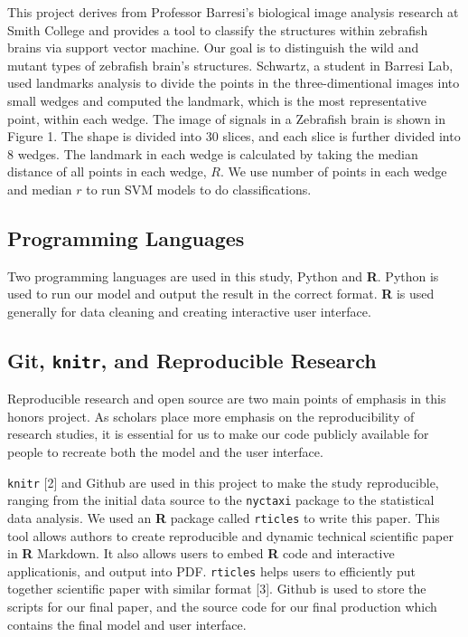 \documentclass[10pt,letterpaper]{article}
\begin{document}
This project derives from Professor Barresi's biological image analysis
research at Smith College and provides a tool to classify the structures
within zebrafish brains via support vector machine. Our goal is to
distinguish the wild and mutant types of zebrafish brain's structures.
Schwartz, a student in Barresi Lab, used landmarks analysis to divide
the points in the three-dimentional images into small wedges and
computed the landmark, which is the most representative point, within
each wedge. The image of signals in a Zebrafish brain is shown in Figure
1. The shape is divided into 30 slices, and each slice is further
divided into 8 wedges. The landmark in each wedge is calculated by
taking the median distance of all points in each wedge, \(R\). We use
number of points in each wedge and median \(r\) to run SVM models to do
classifications.

\subsection{Programming Languages}\label{programming-languages}

Two programming languages are used in this study, Python and \textbf{R}.
Python is used to run our model and output the result in the correct
format. \textbf{R} is used generally for data cleaning and creating
interactive user interface.

\subsection{\texorpdfstring{Git, \texttt{knitr}, and Reproducible
Research}{Git, knitr, and Reproducible Research}}\label{git-knitr-and-reproducible-research}

Reproducible research and open source are two main points of emphasis in
this honors project. As scholars place more emphasis on the
reproducibility of research studies, it is essential for us to make our
code publicly available for people to recreate both the model and the
user interface.

\texttt{knitr} {[}2{]} and Github are used in this project to make the
study reproducible, ranging from the initial data source to the
\texttt{nyctaxi} package to the statistical data analysis. We used an
\textbf{R} package called \texttt{rticles} to write this paper. This
tool allows authors to create reproducible and dynamic technical
scientific paper in \textbf{R} Markdown. It also allows users to embed
\textbf{R} code and interactive applicationis, and output into PDF.
\texttt{rticles} helps users to efficiently put together scientific
paper with similar format {[}3{]}. Github is used to store the scripts
for our final paper, and the source code for our final production which
contains the final model and user interface.
\end{document}
